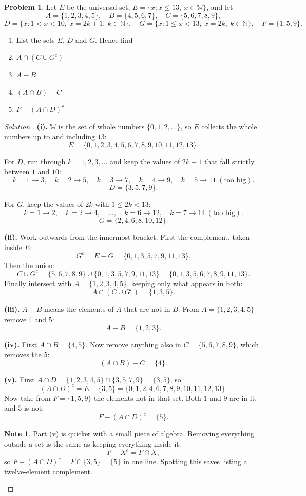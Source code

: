 \documentclass[11pt,a4paper]{article}
\theoremstyle{definition}
\newtheorem{note}[thm]{Note}
\newtheorem{problemx}{Problem}[section]
\newenvironment{problem}{\begin{problemx}}{\end{problemx}}
\newenvironment{solution}
  {\renewcommand{\qedsymbol}{}\begin{proof}[\textit{Solution}.]}
  {\end{proof}}
\begin{document}
\begin{problem}
Let $E$ be the universal set, $E=\{x: x\leq 13,\ x\in\mathbb{W}\}$, and let
$$A=\{1,2,3,4,5\},\quad B=\{4,5,6,7\},\quad C=\{5,6,7,8,9\},$$
$$D=\{x: 1<x<10,\ x=2k+1,\ k\in\mathbb{N}\},\quad
G=\{x: 1\leq x<13,\ x=2k,\ k\in\mathbb{N}\},\quad F=\{1,5,9\}.$$
\begin{enumerate}
\item[(i).] List the sets $E$, $D$ and $G$. Hence find
\item[(ii).] $A\cap\left(C\cup G^c\right)$
\item[(iii).] $A-B$
\item[(iv).] $(A\cap B)-C$
\item[(v).] $F-(A\cap D)^c$
\end{enumerate}
\end{problem}

\begin{solution}
\textbf{(i).} $\mathbb{W}$ is the set of whole numbers $\{0,1,2,\ldots\}$, so $E$ collects
the whole numbers up to and including $13$:
$$E=\{0,1,2,3,4,5,6,7,8,9,10,11,12,13\}.$$

For $D$, run through $k=1,2,3,\ldots$ and keep the values of $2k+1$ that fall strictly
between $1$ and $10$:
$$k=1\to 3,\quad k=2\to 5,\quad k=3\to 7,\quad k=4\to 9,\quad k=5\to 11\ (\text{too
big}).$$
$$D=\{3,5,7,9\}.$$

For $G$, keep the values of $2k$ with $1\leq 2k<13$:
$$k=1\to 2,\quad k=2\to 4,\quad \ldots,\quad k=6\to 12,\quad k=7\to 14\ (\text{too
big}).$$
$$G=\{2,4,6,8,10,12\}.$$

\textbf{(ii).} Work outwards from the innermost bracket. First the complement, taken
inside $E$:
$$G^c=E-G=\{0,1,3,5,7,9,11,13\}.$$
Then the union:
$$C\cup G^c=\{5,6,7,8,9\}\cup\{0,1,3,5,7,9,11,13\}=\{0,1,3,5,6,7,8,9,11,13\}.$$
Finally intersect with $A=\{1,2,3,4,5\}$, keeping only what appears in both:
$$A\cap\left(C\cup G^c\right)=\{1,3,5\}.$$

\textbf{(iii).} $A-B$ means the elements of $A$ that are not in $B$. From
$A=\{1,2,3,4,5\}$ remove $4$ and $5$:
$$A-B=\{1,2,3\}.$$

\textbf{(iv).} First $A\cap B=\{4,5\}$. Now remove anything also in $C=\{5,6,7,8,9\}$,
which removes the $5$:
$$(A\cap B)-C=\{4\}.$$

\textbf{(v).} First $A\cap D=\{1,2,3,4,5\}\cap\{3,5,7,9\}=\{3,5\}$, so
$$(A\cap D)^c=E-\{3,5\}=\{0,1,2,4,6,7,8,9,10,11,12,13\}.$$
Now take from $F=\{1,5,9\}$ the elements not in that set. Both $1$ and $9$ are in it, and
$5$ is not:
$$F-(A\cap D)^c=\{5\}.$$

\begin{note}
Part (v) is quicker with a small piece of algebra. Removing everything outside a set is
the same as keeping everything inside it:
$$F-X^c=F\cap X,$$
so $F-(A\cap D)^c=F\cap\{3,5\}=\{5\}$ in one line. Spotting this saves listing a
twelve-element complement.
\end{note}
\end{solution}
\end{document}
